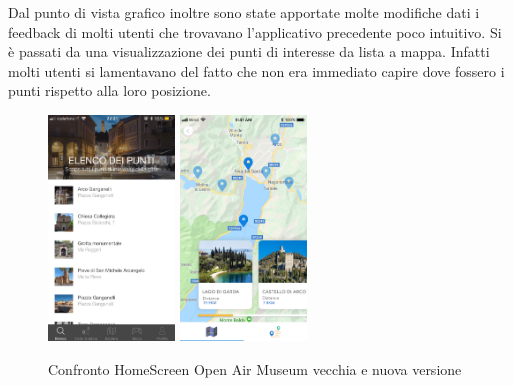 Dal punto di vista grafico inoltre sono state apportate molte modifiche dati i feedback di molti utenti che trovavano l’applicativo precedente poco intuitivo. Si è passati da una visualizzazione dei punti di interesse da lista a mappa. Infatti molti utenti si lamentavano del fatto che non era immediato capire dove fossero i punti rispetto alla loro posizione.\vspace{5mm}

\begin{figure}[h]
\centering
\includegraphics[width=0.3\textwidth]{images/screenSantarcangelo.jpg}
\includegraphics[width=0.3\textwidth]{images/listapunti.png}
\caption{Confronto HomeScreen Open Air Museum vecchia e nuova versione}
\end{figure}
\vspace{5mm}

